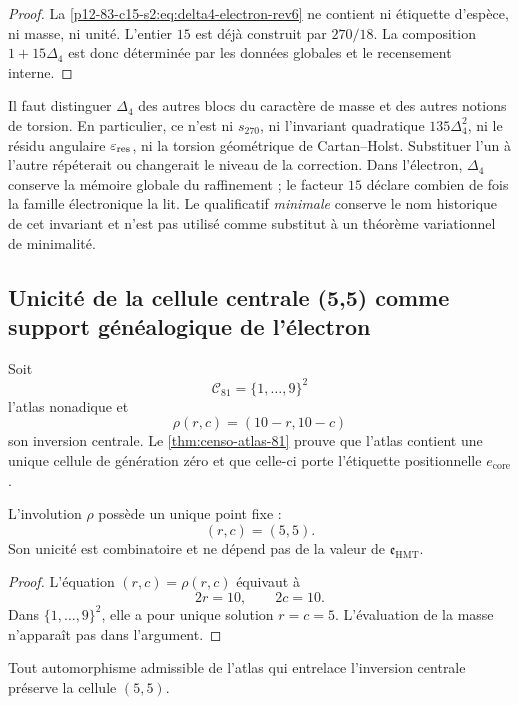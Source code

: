 \begin{proof}
La \cref{p12-83-c15-s2:eq:delta4-electron-rev6} ne contient ni étiquette d'espèce, ni
masse, ni unité. L'entier \(15\) est déjà construit par \(270/18\).
La composition \(1+15\Delta_4\) est donc déterminée par les données
globales et le recensement interne.
\end{proof}

Il faut distinguer \(\Delta_4\) des autres blocs du caractère de masse et des
autres notions de torsion. En particulier, ce n'est ni \(s_{270}\), ni
l'invariant quadratique \(135\Delta_4^2\), ni le résidu angulaire
\(\varepsilon_{\rm res}\), ni la torsion géométrique de Cartan--Holst.
Substituer l'un à l'autre répéterait ou changerait le niveau de la correction. Dans
l'électron, \(\Delta_4\) conserve la mémoire globale du raffinement ; le facteur
\(15\) déclare combien de fois la famille électronique la lit. Le qualificatif
\emph{minimale} conserve le nom historique de cet invariant et n'est pas utilisé
comme substitut à un théorème variationnel de minimalité.

\subsection{Unicité de la cellule centrale (5,5) comme support généalogique de l'électron}

Soit
\[
 \mathcal C_{81}=\{1,\ldots,9\}^2
\]
l'atlas nonadique et
\[
 \rho(r,c)=(10-r,10-c)
\]
son inversion centrale. Le \cref{thm:censo-atlas-81} prouve que l'atlas
contient une unique cellule de génération zéro et que celle-ci porte l'étiquette
positionnelle \(e_{\mathrm{core}}\).

\begin{proposition}
\label{p12-83-c15-s2:prop:centro-electron-rev6}
L'involution \(\rho\) possède un unique point fixe :
\[
 \boxed{(r,c)=(5,5).}
\]
Son unicité est combinatoire et ne dépend pas de la valeur de
\(\mathfrak e_{\mathrm{HMT}}\).
\end{proposition}

\begin{proof}
L'équation \((r,c)=\rho(r,c)\) équivaut à
\[
 2r=10,\qquad2c=10.
\]
Dans \(\{1,\ldots,9\}^2\), elle a pour unique solution \(r=c=5\). L'évaluation
de la masse n'apparaît pas dans l'argument.
\end{proof}

\begin{corollary}
\label{p12-83-c15-s2:cor:universalidad-electron-central-rev6}
Tout automorphisme admissible de l'atlas qui entrelace l'inversion centrale
préserve la cellule \((5,5)\).
\end{corollary}

